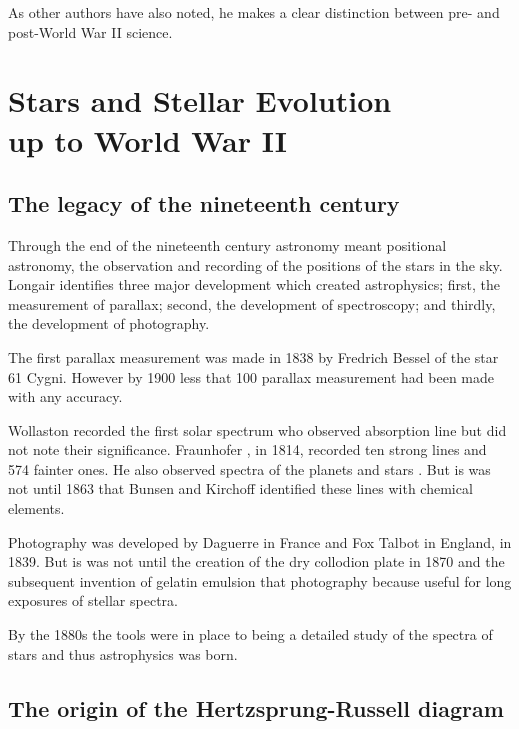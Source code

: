 As other authors have also noted, he makes a clear distinction between
pre- and post-World War II science.


\section{Stars and Stellar Evolution\\ up to World War II}

\subsection{The legacy of the nineteenth century}

Through the end of the nineteenth century astronomy
meant positional astronomy, the observation and recording of the
positions of the stars in the sky.  Longair identifies three major
development which created astrophysics; first, the measurement of
parallax; second, the development of spectroscopy; and thirdly, the
development of photography.

The first parallax measurement was made
in 1838 by Fredrich Bessel \cite{Bessel1839} of the star 61
Cygni. However by 1900 less that 100 parallax measurement had been
made with any accuracy.

Wollaston \cite{Wollaston1802}
recorded  the first solar spectrum
who observed absorption line but did not note their significance.
Fraunhofer \cite{Fraunhofer1817}, in 1814, recorded ten strong lines
and 574 fainter ones. He also observed spectra of the planets and
stars \cite{Fraunhofer1823}. But is was not until 1863 that Bunsen
and Kirchoff \cite{Kirchoff1861} identified these lines with
chemical elements.

Photography was developed by Daguerre
in France and Fox Talbot in England, in 1839. But is was not until the
creation of the dry collodion plate in 1870 and the subsequent
invention of gelatin emulsion that photography because useful for long
exposures of stellar spectra.

By the 1880s the tools were in place to being a
detailed study of the spectra of stars and thus astrophysics was born.


\subsection{The origin of the Hertzsprung-Russell diagram}

